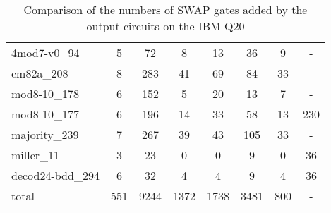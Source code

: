 \documentclass[journal]{IEEEtran}
\begin{document}
\begin{table*}[htbp]
\begin{center}
\begin{tabular}{|p{4.3cm}<{\centering}|c|c|c|c|c|c|c|}
            4mod7-v0\_94 & 5 & 72 & 8 & 13 & 36 & 9& - \\
            cm82a\_208 & 8 & 283 & 41 & 69 & 84 & 33& - \\
            mod8-10\_178 & 6 & 152 & 5 & 20 & 13 & 7& - \\
            mod8-10\_177 & 6 & 196 & 14 & 33 & 58 & 13& 230 \\
            majority\_239 & 7 & 267 & 39 & 43 & 105 & 33& - \\
            miller\_11 & 3 & 23 & 0 & 0 & 9 & 0& 36 \\
            decod24-bdd\_294 & 6 & 32 & 4 & 4 & 9 & 4& 36 \\
            \hline
            total & 551 & 9244 & 1372 & 1738 & 3481 & 800 &-\\
        \hline
        \end{tabular} 
        \end{center} 
        \caption{Comparison of the numbers of SWAP gates added by the 
        output circuits on the IBM Q20 } 
        \label{tab3}
        \end{table*}	
\end{document}
